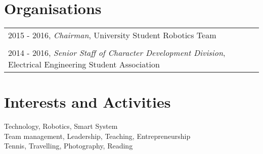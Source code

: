 \documentclass[a4paper,10pt]{article} %
\begin{document}
\vspace{-3mm}
\section{Organisations}

\begin{tabular}{l}
\vspace{-2mm}
\textsc{2015 - 2016}, \textit{Chairman}, University Student Robotics Team\\
\\
\textsc{2014 - 2016}, \textit{Senior Staff of Character Development Division}, Electrical Engineering Student Association\\

\end{tabular}


\section{Interests and Activities}

Technology, Robotics, Smart System\\
Team management, Leadership, Teaching, Entrepreneurship\\
Tennis, Travelling, Photography, Reading
\end{document}
